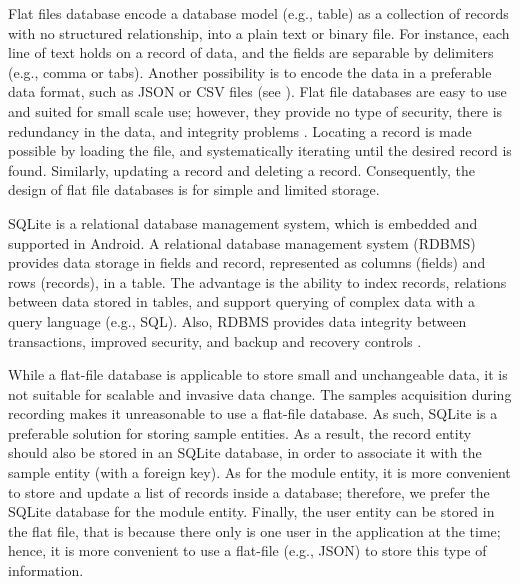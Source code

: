 Flat files database encode a database model (e.g., table) as a collection of records with no structured relationship, into a plain text or binary file. For instance, each line of text holds on a record of data, and the fields are separable by delimiters (e.g., comma or tabs). Another possibility is to encode the data in a preferable data format, such as JSON or CSV files (see ). Flat file databases are easy to use and suited for small scale use; however, they provide no type of security, there is redundancy in the data, and integrity problems \cite{flatfilerdbms}. Locating a record is made possible by loading the file, and systematically iterating until the desired record is found. Similarly, updating a record and deleting a record. Consequently, the design of flat file databases is for simple and limited storage.

SQLite is a relational database management system, which is embedded and supported in Android. A relational database management system (RDBMS) provides data storage in fields and record, represented as columns (fields) and rows (records), in a table. The advantage is the ability to index records, relations between data stored in tables, and support querying of complex data with a query language (e.g., SQL). Also, RDBMS provides data integrity between transactions, improved security, and backup and recovery controls \cite{flatfilerdbms}. 

While a flat-file database is applicable to store small and unchangeable data, it is not suitable for scalable and invasive data change. The samples acquisition during recording makes it unreasonable to use a flat-file database. As such, SQLite is a preferable solution for storing sample entities. As a result, the record entity should also be stored in an SQLite database, in order to associate it with the sample entity (with a foreign key). As for the module entity, it is more convenient to store and update a list of records inside a database; therefore, we prefer the SQLite database for the module entity. Finally, the user entity can be stored in the flat file, that is because there only is one user in the application at the time; hence, it is more convenient to use a flat-file (e.g., JSON) to store this type of information.


